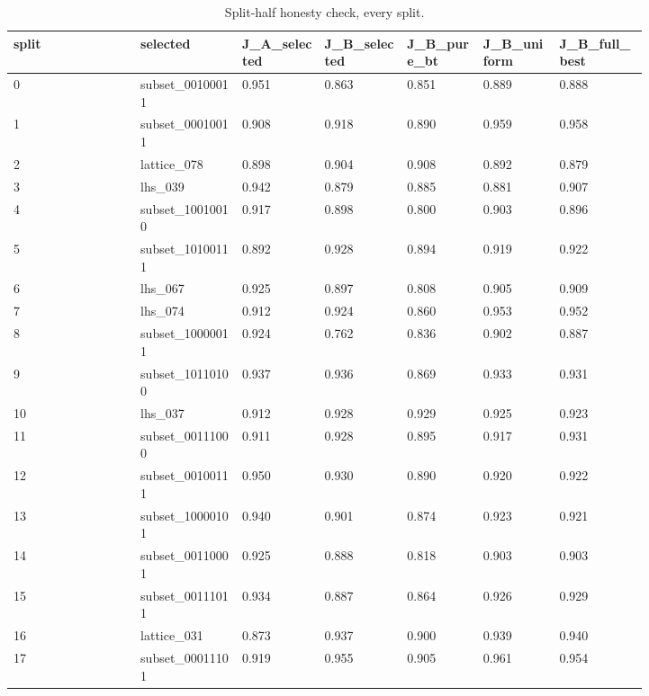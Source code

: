 \tiny
\setlength{\tabcolsep}{3pt}
\begin{longtable}{lp{0.167\linewidth}p{0.133\linewidth}p{0.133\linewidth}p{0.122\linewidth}p{0.122\linewidth}p{0.144\linewidth}}
\caption{Split-half honesty check, every split.}\label{tab:split_half}\\
\toprule
split & selected & J\_\allowbreak{}A\_\allowbreak{}selected & J\_\allowbreak{}B\_\allowbreak{}selected & J\_\allowbreak{}B\_\allowbreak{}pure\_\allowbreak{}bt & J\_\allowbreak{}B\_\allowbreak{}uniform & J\_\allowbreak{}B\_\allowbreak{}full\_\allowbreak{}best \\
\midrule
0 & subset\_\allowbreak{}00100011 & 0.951 & 0.863 & 0.851 & 0.889 & 0.888 \\
1 & subset\_\allowbreak{}00010011 & 0.908 & 0.918 & 0.890 & 0.959 & 0.958 \\
2 & lattice\_\allowbreak{}078 & 0.898 & 0.904 & 0.908 & 0.892 & 0.879 \\
3 & lhs\_\allowbreak{}039 & 0.942 & 0.879 & 0.885 & 0.881 & 0.907 \\
4 & subset\_\allowbreak{}10010010 & 0.917 & 0.898 & 0.800 & 0.903 & 0.896 \\
5 & subset\_\allowbreak{}10100111 & 0.892 & 0.928 & 0.894 & 0.919 & 0.922 \\
6 & lhs\_\allowbreak{}067 & 0.925 & 0.897 & 0.808 & 0.905 & 0.909 \\
7 & lhs\_\allowbreak{}074 & 0.912 & 0.924 & 0.860 & 0.953 & 0.952 \\
8 & subset\_\allowbreak{}10000011 & 0.924 & 0.762 & 0.836 & 0.902 & 0.887 \\
9 & subset\_\allowbreak{}10110100 & 0.937 & 0.936 & 0.869 & 0.933 & 0.931 \\
10 & lhs\_\allowbreak{}037 & 0.912 & 0.928 & 0.929 & 0.925 & 0.923 \\
11 & subset\_\allowbreak{}00111000 & 0.911 & 0.928 & 0.895 & 0.917 & 0.931 \\
12 & subset\_\allowbreak{}00100111 & 0.950 & 0.930 & 0.890 & 0.920 & 0.922 \\
13 & subset\_\allowbreak{}10000101 & 0.940 & 0.901 & 0.874 & 0.923 & 0.921 \\
14 & subset\_\allowbreak{}00110001 & 0.925 & 0.888 & 0.818 & 0.903 & 0.903 \\
15 & subset\_\allowbreak{}00111011 & 0.934 & 0.887 & 0.864 & 0.926 & 0.929 \\
16 & lattice\_\allowbreak{}031 & 0.873 & 0.937 & 0.900 & 0.939 & 0.940 \\
17 & subset\_\allowbreak{}00011101 & 0.919 & 0.955 & 0.905 & 0.961 & 0.954 \\

\end{longtable}
